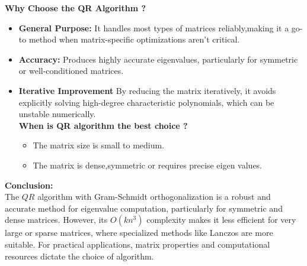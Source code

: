 \documentclass[journal,12pt,onecolumn]{IEEEtran}
\theoremstyle{remark}
\begin{document}
\textbf{Why Choose the QR Algorithm ?}
\begin{itemize}
    \item \textbf{General Purpose:} It handles most types of matrices reliably,making it a go-to method when matrix-specific optimizations aren't critical.\\

    \item \textbf{Accuracy:} Produces highly accurate eigenvalues, particularly for symmetric or well-conditioned matrices.\\

    \item \textbf{Iterative Improvement} By reducing the matrix iteratively, it avoids explicitly solving high-degree characteristic polynomials, which can be unstable numerically.\\
\newpage
  \textbf{When is QR algorithm the best choice ?}
  \begin{itemize}
      \item The matrix size is small to medium.
      \item The matrix is dense,symmetric or requires precise eigen values.\\
  \end{itemize}

\end{itemize}
\textbf{Conclusion:} \\
The $QR$ algorithm with Gram-Schmidt orthogonalization is a robust and accurate method for eigenvalue computation, particularly for symmetric and dense matrices. However, its $O(kn^3)$ complexity makes it less efficient for very large or sparse matrices, where specialized methods like Lanczos are more suitable. For practical applications, matrix properties and computational resources dictate the choice of algorithm.
\end{document}

